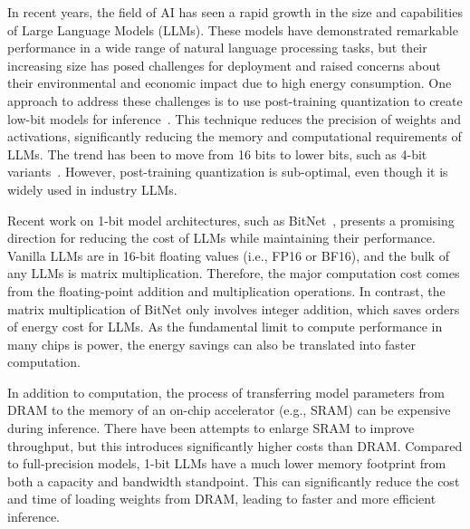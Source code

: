 \documentclass{article}
\begin{document}
In recent years, the field of AI has seen a rapid growth in the size and capabilities of Large Language Models (LLMs). These models have demonstrated remarkable performance in a wide range of natural language processing tasks, but their increasing size has posed challenges for deployment and raised concerns about their environmental and economic impact due to high energy consumption. 
%
One approach to address these challenges is to use post-training quantization to create low-bit models for inference~\cite{smoothquant, gptq, quip, quip_sharp}. This technique reduces the precision of weights and activations, significantly reducing the memory and computational requirements of LLMs. The trend has been to move from 16 bits to lower bits, such as 4-bit variants~\cite{gptq, awq}. However, post-training quantization is sub-optimal, even though it is widely used in industry LLMs.

Recent work on 1-bit model architectures, such as BitNet~\cite{bitnet}, presents a promising direction for reducing the cost of LLMs while maintaining their performance. Vanilla LLMs are in 16-bit floating values (i.e., FP16 or BF16), and the bulk of any LLMs is matrix multiplication. Therefore, the major computation cost comes from the floating-point addition and multiplication operations. In contrast, the matrix multiplication of BitNet only involves integer addition, which saves orders of energy cost for LLMs. As the fundamental limit to compute performance in many chips is power, the energy savings can also be translated into faster computation.

In addition to computation, the process of transferring model parameters from DRAM to the memory of an on-chip accelerator (e.g., SRAM) can be expensive during inference. There have been attempts to enlarge SRAM to improve throughput, but this introduces significantly higher costs than DRAM. Compared to full-precision models, 1-bit LLMs have a much lower memory footprint from both a capacity and bandwidth standpoint. This can significantly reduce the cost and time of loading weights from DRAM, leading to faster and more efficient inference.
\end{document}
